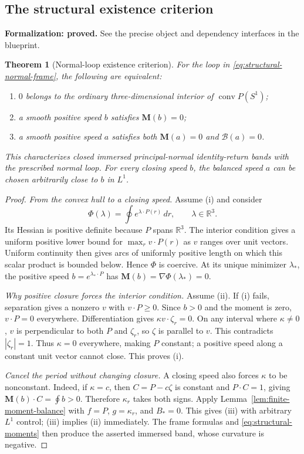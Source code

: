 \documentclass[11pt]{amsart}
\newtheorem{theorem}{Theorem}[section]
\theoremstyle{definition}
\theoremstyle{remark}
\newcommand{\R}{\mathbb R}\newcommand{\Sph}{\mathbb S}
\DeclareMathOperator{\conv}{conv}\DeclareMathOperator{\Stab}{Stab}
\numberwithin{equation}{section}
\begin{document}
\subsection{The structural existence criterion}
\par\noindent\textbf{Formalization: proved.} See the precise object and dependency interfaces in the blueprint.\par
\begin{theorem}[Normal-loop existence criterion]\label{thm:normal-loop-criterion}
For the loop in \eqref{eq:structural-normal-frame}, the following are
equivalent:
\begin{enumerate}[label=\textup{(\roman*)}]
\item $0$ belongs to the ordinary three-dimensional interior of
$\conv P(S^1)$;
\item a smooth positive speed $b$ satisfies $\mathbf M(b)=0$;
\item a smooth positive speed $a$ satisfies both
$\mathbf M(a)=0$ and $\mathscr B(a)=0$.
\end{enumerate}
This characterizes closed immersed principal-normal identity-return bands
with the prescribed normal loop. For every closing speed $b$, the balanced
speed $a$ can be chosen arbitrarily close to $b$ in $L^1$.
\end{theorem}
\begin{proof}
\emph{From the convex hull to a closing speed.}
Assume (i) and consider
\[
 \Phi(\lambda)=\oint e^{\lambda\cdot P(r)}\,dr,
 \qquad \lambda\in\R^3.
\]
Its Hessian is positive definite because $P$ spans $\R^3$. The interior
condition gives a uniform positive lower bound for
$\max_r v\cdot P(r)$ as $v$ ranges over unit vectors. Uniform continuity
then gives arcs of uniformly positive length on which this scalar product
is bounded below. Hence $\Phi$ is coercive. At its unique minimizer
$\lambda_*$, the positive speed $b=e^{\lambda_*\cdot P}$ has
$\mathbf M(b)=\nabla\Phi(\lambda_*)=0$.

\emph{Why positive closure forces the interior condition.}
Assume (ii). If (i) fails, separation gives a nonzero $v$ with
$v\cdot P\ge0$. Since $b>0$ and the moment is zero, $v\cdot P=0$
everywhere. Differentiation gives $\kappa v\cdot\zeta_r=0$.
On any interval where $\kappa\ne0$, $v$ is perpendicular to both
$P$ and $\zeta_r$, so $\zeta$ is parallel to $v$. This contradicts
$|\zeta_r|=1$. Thus $\kappa=0$ everywhere, making $P$ constant;
a positive speed along a constant unit vector cannot close. This proves (i).

\emph{Cancel the period without changing closure.}
A closing speed also forces $\kappa$ to be nonconstant. Indeed, if
$\kappa=c$, then $C=P-c\zeta$ is constant and $P\cdot C=1$, giving
$\mathbf M(b)\cdot C=\oint b>0$. Therefore $\kappa_r$ takes both signs.
Apply Lemma~\ref{lem:finite-moment-balance} with $f=P$, $g=\kappa_r$,
and $B_*=0$. This gives (iii) with arbitrary $L^1$ control; (iii) implies
(ii) immediately. The frame formulas and \eqref{eq:structural-moments}
then produce the asserted immersed band, whose curvature is negative.
\end{proof}
\end{document}
